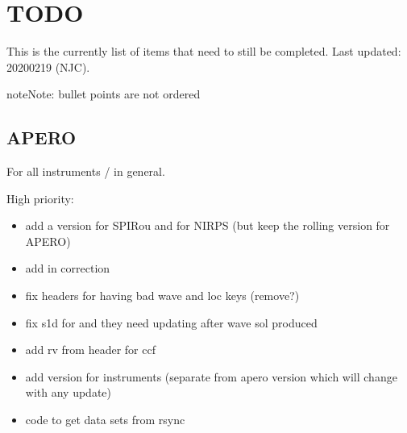 \documentclass[a4paper,10pt,english]{report}
\begin{document}
\section{TODO}
\label{\detokenize{user/general/todo:todo}}\label{\detokenize{user/general/todo:id1}}\label{\detokenize{user/general/todo::doc}}
This is the currently list of items that need to still be completed.
Last updated: 2020\sphinxhyphen{}02\sphinxhyphen{}19 (NJC).

\begin{sphinxadmonition}{note}{Note:}
bullet points are not ordered
\end{sphinxadmonition}


\subsection{APERO}
\label{\detokenize{user/general/todo:apero}}
For all instruments / in general.

High priority:
\begin{itemize}
\item {} 
add a version for SPIRou and for NIRPS (but keep the rolling version for APERO)

\item {} 
add in  correction

\item {} 
fix headers for having bad wave and loc keys (remove?)

\item {} 
fix s1d for  and  they need updating after wave sol produced

\item {} 
add rv from header for ccf

\item {} 
add version for instruments (separate from apero version which will change with any update)

\item {} 
code to get data sets from rsync

\end{itemize}
\end{document}
